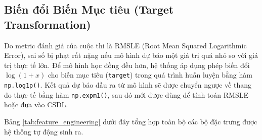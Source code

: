 \documentclass[12pt,a4paper]{report}
\begin{document}
\subsection{Biến đổi Biến Mục tiêu (Target Transformation)}
Do metric đánh giá của cuộc thi là RMSLE (Root Mean Squared Logarithmic Error), sai số bị phạt rất nặng nếu mô hình dự báo một giá trị quá nhỏ so với giá trị thực tế lớn. Để mô hình học đồng đều hơn, hệ thống áp dụng phép biến đổi $\log(1 + x)$ cho biến mục tiêu (\texttt{target}) trong quá trình huấn luyện bằng hàm \texttt{np.log1p()}. Kết quả dự báo đầu ra từ mô hình sẽ được chuyển ngược về thang đo thực tế bằng hàm \texttt{np.expm1()}, sau đó mới được dùng để tính toán RMSLE hoặc đưa vào CSDL.

Bảng \ref{tab:feature_engineering} dưới đây tổng hợp toàn bộ các bộ đặc trưng được hệ thống tự động sinh ra.
\end{document}
